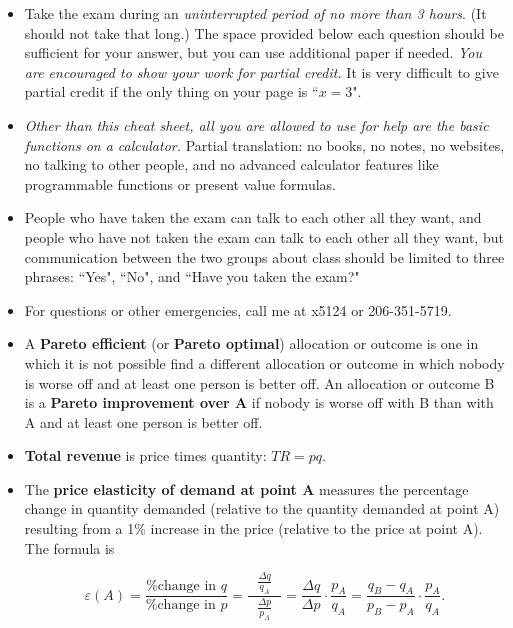 \documentclass{article}
\begin{document}
\begin{EXAM}

\begin{itemize}

\item Take the exam during an \emph{uninterrupted period of no more than 3 hours}. (It should not take that long.) The space provided below each question should be sufficient for your answer, but you can use additional paper if needed. \emph{You are encouraged to show your work for partial credit.} It is very difficult to give partial credit if the only thing on your page is ``$x=3$".

\item \emph{Other than this cheat sheet, all you are allowed to use for help are the basic functions on a calculator.} Partial translation: no books, no notes, no websites, no talking to other people, and no advanced calculator features like programmable functions or present value formulas.

\item People who have taken the exam can talk to each other all they want, and people who have not taken the exam can talk to each other all they want, but communication between the two groups about class should be limited to three phrases: ``Yes", ``No", and ``Have you taken the exam?"

\item For questions or other emergencies, call me at x5124 or 206-351-5719.

\item A \textbf{Pareto efficient} (or \textbf{Pareto optimal}) allocation or outcome is one in which it is not possible find a different allocation or outcome in which nobody is worse off and at least one person is better off. An allocation or outcome B is a \textbf{Pareto improvement over A} if nobody is worse off with B than with A and at least one person is better off.

\item \textbf{Total revenue} is price times quantity: $TR = pq$.

\item The \textbf{price elasticity of demand at point A} measures the percentage change in quantity demanded (relative to the quantity demanded at point A) resulting from a 1\% increase in the price (relative to the price at point A). The formula is

\[
\varepsilon (A)=\frac{\mbox{\% change in } q}{\mbox{\% change in } p} = \displaystyle\frac{\ \ \ \displaystyle\frac{\Delta q}{q_A}\ \ \ }{\displaystyle\frac{\Delta p}{p_A}} =
\frac{\Delta q}{\Delta p}\cdot\frac{p_A}{q_A} =
\frac{q_B-q_A}{p_B-p_A}\cdot\frac{p_A}{q_A}.
\]



\end{itemize}
\end{EXAM}
\end{document}
